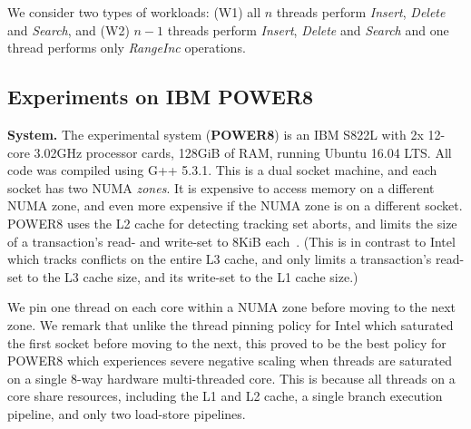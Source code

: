 We consider two types of workloads: (W1) all $n$ threads perform \textit{Insert}, \textit{Delete} and \textit{Search}, and (W2) $n-1$ threads perform \textit{Insert}, \textit{Delete} and \textit{Search} and one thread performs only \textit{RangeInc} operations.




































\subsection{Experiments on IBM POWER8}

\vspace{1mm}\noindent\textbf{System.}
The experimental system (\textbf{POWER8}) is an IBM S822L with 2x 12-core 3.02GHz processor cards, 128GiB of RAM, running Ubuntu 16.04 LTS.
All code was compiled using G++ 5.3.1.
This is a dual socket machine, and each socket has two NUMA \emph{zones}.
It is expensive to access memory on a different NUMA zone, and even more expensive if the NUMA zone is on a different socket.
POWER8 uses the L2 cache for detecting tracking set aborts, and limits the size of a transaction's read- and write-set to 8KiB each~\cite{htm-survey}.
(This is in contrast to Intel which tracks conflicts on the entire L3 cache, and only limits a transaction's read-set to the L3 cache size, and its write-set to the L1 cache size.)

We pin one thread on each core within a NUMA zone before moving to the next zone.
We remark that unlike the thread pinning policy for Intel which saturated the first socket before moving to the next, this proved to be the best policy
for POWER8 which experiences severe negative scaling when threads are saturated on a single 8-way hardware multi-threaded core.
This is because all threads on a core share resources, including the L1 and L2 cache, a single branch execution pipeline, 
and only two load-store pipelines.


